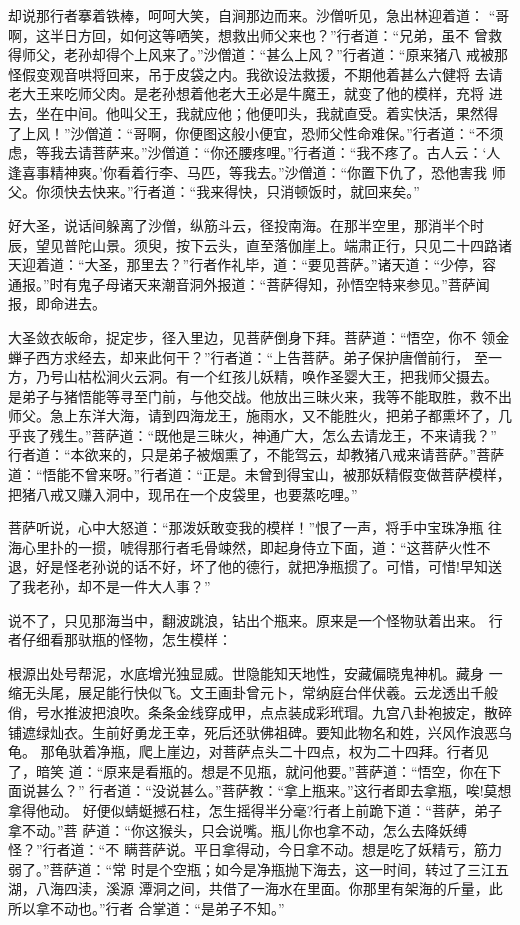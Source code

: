 却说那行者搴着铁棒，呵呵大笑，自涧那边而来。沙僧听见，急出林迎着道：
“哥啊，这半日方回，如何这等哂笑，想救出师父来也？”行者道：“兄弟，虽不
曾救得师父，老孙却得个上风来了。”沙僧道：“甚么上风？”行者道：“原来猪八
戒被那怪假变观音哄将回来，吊于皮袋之内。我欲设法救援，不期他着甚么六健将
去请老大王来吃师父肉。是老孙想着他老大王必是牛魔王，就变了他的模样，充将
进去，坐在中间。他叫父王，我就应他；他便叩头，我就直受。着实快活，果然得
了上风！”沙僧道：“哥啊，你便图这般小便宜，恐师父性命难保。”行者道：“不须
虑，等我去请菩萨来。”沙僧道：“你还腰疼哩。”行者道：“我不疼了。古人云：‘人
逢喜事精神爽。’你看着行李、马匹，等我去。”沙僧道：“你置下仇了，恐他害我
师父。你须快去快来。”行者道：“我来得快，只消顿饭时，就回来矣。”

好大圣，说话间躲离了沙僧，纵筋斗云，径投南海。在那半空里，那消半个时
辰，望见普陀山景。须臾，按下云头，直至落伽崖上。端肃正行，只见二十四路诸
天迎着道：“大圣，那里去？”行者作礼毕，道：“要见菩萨。”诸天道：“少停，容
通报。”时有鬼子母诸天来潮音洞外报道：“菩萨得知，孙悟空特来参见。”菩萨闻
报，即命进去。

大圣敛衣皈命，捉定步，径入里边，见菩萨倒身下拜。菩萨道：“悟空，你不
领金蝉子西方求经去，却来此何干？”行者道：“上告菩萨。弟子保护唐僧前行，
至一方，乃号山枯松涧火云洞。有一个红孩儿妖精，唤作圣婴大王，把我师父摄去。
是弟子与猪悟能等寻至门前，与他交战。他放出三昧火来，我等不能取胜，救不出
师父。急上东洋大海，请到四海龙王，施雨水，又不能胜火，把弟子都熏坏了，几
乎丧了残生。”菩萨道：“既他是三昧火，神通广大，怎么去请龙王，不来请我？”
行者道：“本欲来的，只是弟子被烟熏了，不能驾云，却教猪八戒来请菩萨。”菩萨
道：“悟能不曾来呀。”行者道：“正是。未曾到得宝山，被那妖精假变做菩萨模样，
把猪八戒又赚入洞中，现吊在一个皮袋里，也要蒸吃哩。”

菩萨听说，心中大怒道：“那泼妖敢变我的模样！”恨了一声，将手中宝珠净瓶
往海心里扑的一掼，唬得那行者毛骨竦然，即起身侍立下面，道：“这菩萨火性不
退，好是怪老孙说的话不好，坏了他的德行，就把净瓶掼了。可惜，可惜!早知送
了我老孙，却不是一件大人事？”

说不了，只见那海当中，翻波跳浪，钻出个瓶来。原来是一个怪物驮着出来。
行者仔细看那驮瓶的怪物，怎生模样：

根源出处号帮泥，水底增光独显威。世隐能知天地性，安藏偏晓鬼神机。藏身
一缩无头尾，展足能行快似飞。文王画卦曾元卜，常纳庭台伴伏羲。云龙透出千般
俏，号水推波把浪吹。条条金线穿成甲，点点装成彩玳瑁。九宫八卦袍披定，散碎
铺遮绿灿衣。生前好勇龙王幸，死后还驮佛祖碑。要知此物名和姓，兴风作浪恶乌
龟。
那龟驮着净瓶，爬上崖边，对菩萨点头二十四点，权为二十四拜。行者见了，暗笑
道：“原来是看瓶的。想是不见瓶，就问他要。”菩萨道：“悟空，你在下面说甚么？”
行者道：“没说甚么。”菩萨教：“拿上瓶来。”这行者即去拿瓶，唉!莫想拿得他动。
好便似蜻蜓撼石柱，怎生摇得半分毫?行者上前跪下道：“菩萨，弟子拿不动。”菩
萨道：“你这猴头，只会说嘴。瓶儿你也拿不动，怎么去降妖缚怪？”行者道：“不
瞒菩萨说。平日拿得动，今日拿不动。想是吃了妖精亏，筋力弱了。”菩萨道：“常
时是个空瓶；如今是净瓶抛下海去，这一时间，转过了三江五湖，八海四渎，溪源
潭洞之间，共借了一海水在里面。你那里有架海的斤量，此所以拿不动也。”行者
合掌道：“是弟子不知。”

